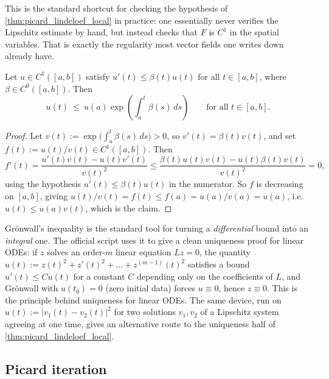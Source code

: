 \begin{remark}
This is the standard shortcut for checking the hypothesis of
\cref{thm:picard_lindeloef_local} in practice: one essentially never verifies the Lipschitz
estimate by hand, but instead checks that $F$ is $C^1$ in the spatial variables. That is
exactly the regularity most vector fields one writes down already have.
\end{remark}

\begin{lemma}
\label{lem:gronwall}
Let $u \in C^1([a,b])$ satisfy $u'(t) \leq \beta(t)u(t)$ for all $t \in [a,b]$, where
$\beta \in C^0([a,b])$. Then
\[u(t) \ \leq\ u(a)\exp\!\left(\int_a^t\beta(s)\,ds\right) \qquad \text{for all } t \in [a,b].\]
\end{lemma}

\begin{proof}
Let $v(t) := \exp\big(\int_a^t\beta(s)\,ds\big) > 0$, so $v'(t) = \beta(t)v(t)$, and set
$f(t) := u(t)/v(t) \in C^1([a,b])$. Then
\[f'(t) = \frac{u'(t)v(t)-u(t)v'(t)}{v(t)^2}
  \leq \frac{\beta(t)u(t)v(t) - u(t)\beta(t)v(t)}{v(t)^2} = 0,\]
using the hypothesis $u'(t) \leq \beta(t)u(t)$ in the numerator. So $f$ is decreasing on $[a,b]$,
giving $u(t)/v(t) = f(t) \leq f(a) = u(a)/v(a) = u(a)$, i.e.\ $u(t) \leq u(a)v(t)$, which is the
claim.
\end{proof}

\begin{remark}
Grönwall's inequality is the standard tool for turning a \emph{differential} bound into an
\emph{integral} one. The official script uses it to give a clean uniqueness proof for linear
ODEs: if $z$ solves an order-$m$ linear equation $Lz=0$, the quantity
$u(t) := z(t)^2+z'(t)^2+\dots+z^{(m-1)}(t)^2$ satisfies a bound $u'(t) \leq Cu(t)$ for a constant
$C$ depending only on the coefficients of $L$, and Grönwall with $u(t_0)=0$ (zero initial data)
forces $u\equiv0$, hence $z\equiv0$. This is the  principle behind
uniqueness for linear ODEs. The same device, run on $u(t):=|v_1(t)-v_2(t)|^2$ for two solutions
$v_1,v_2$ of a Lipschitz system agreeing at one time, gives an alternative route to the
uniqueness half of \cref{thm:picard_lindeloef_local}.
\end{remark}

\subsection{Picard iteration}
\label{sec:picard_iteration}

